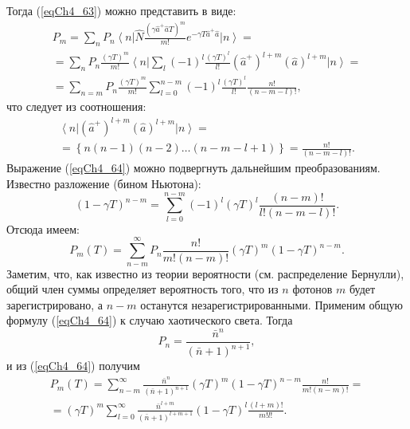 Тогда (\ref{eqCh4_63}) можно представить в виде:
\begin{eqnarray}
P_m = \sum_n P_n 
\left<n\right|
\hat{N}
\frac{\left(\gamma \hat{a}^{+} \hat{a} T\right)^m}{m!}
e^{- \gamma T \hat{a}^{+} \hat{a}}
\left|n\right> = 
\nonumber \\
=
\sum_n P_n 
\frac{\left(\gamma T\right)^m}{m!}
\left<n\right|
\sum_l\left(-1\right)^l
\frac{\left(\gamma T\right)^l}{l!}
\left(\hat{a}^{+}\right)^{l + m}
\left(\hat{a}\right)^{l + m}
\left|n\right> = 
\nonumber \\
=
\sum_{n = m}
P_n 
\frac{\left(\gamma T\right)^m}{m!}
\sum_{l = 0}^{n - m}\left(-1\right)^l
\frac{\left(\gamma T\right)^l}{l!}
\frac{n!}{\left(n - m - l\right)!},
\label{eqCh4_64}
\end{eqnarray}
что следует из соотношения:
\begin{eqnarray}
\left<n\right|
\left(\hat{a}^{+}\right)^{l + m}
\left(\hat{a}\right)^{l + m}
\left|n\right> = 
\nonumber \\
= \left\{
n \left(n - 1\right)\left(n - 2\right) \dotsc
\left(n - m - l + 1\right)
\right\} = 
\frac{n!}{\left(n - m - l\right)!}.
\nonumber
\end{eqnarray}
Выражение (\ref{eqCh4_64}) можно подвергнуть дальнейшим
преобразованиям. Известно разложение (бином Ньютона): 
\[
\left(1 - \gamma T\right)^{n - m} = 
\sum_{l = 0}^{n -m}
\left(-1\right)^l
\left(\gamma T\right)^l
\frac{\left(n - m\right)!}{l!\left(n - m - l\right)!}.
\]
Отсюда имеем:
\begin{equation}
P_m\left(T\right) = 
\sum_{n - m}^{\infty}
P_n 
\frac{n!}{m!\left(n - m\right)!}
\left(\gamma T\right)^m
\left(1 - \gamma T\right)^{n - m}.
\label{eqCh4_64a}
\end{equation}
Заметим, что, как известно из теории вероятности (см. распределение
Бернулли), общий член суммы определяет вероятность того, что из $n$
фотонов $m$ будет зарегистрировано, а  $n - m$  останутся
незарегистрированными. Применим общую формулу (\ref{eqCh4_64}) к случаю
хаотического света. Тогда  
\[
P_n = \frac{\bar{n}^n}{\left(\bar{n} + 1\right)^{n + 1}},
\]
и из (\ref{eqCh4_64}) получим 
\begin{eqnarray}
P_m\left(T\right) = 
\sum_{n - m}^{\infty}
\frac{\bar{n}^n}{\left(\bar{n} + 1\right)^{n + 1}}
\left(\gamma T\right)^m
\left(1 - \gamma T\right)^{n - m} 
\frac{n!}{m!\left(n - m\right)!}
=
\nonumber \\
=
\left(\gamma T\right)^m
\sum_{l = 0}^{\infty}
\frac{\bar{n}^{l + m}}{\left(\bar{n} + 1\right)^{l + m + 1}}
\left(1 - \gamma T\right)^{l}
\frac{\left(l + m\right)!}{m! l!}. 
\label{eqCh4_65}
\end{eqnarray}

